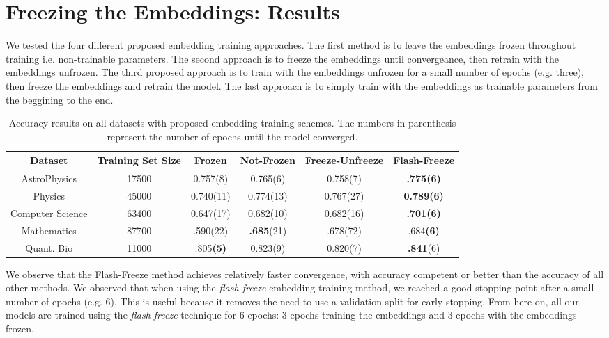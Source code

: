 \section{Freezing the Embeddings: Results}
We tested the four different proposed embedding training approaches.
The first method is to leave the embeddings frozen throughout training i.e. non-trainable parameters.
The second approach is to freeze the embeddings until convergeance, then retrain with the embeddings unfrozen.
The third proposed approach is to train with the embeddings unfrozen for a small number of epochs (e.g. three), then
freeze the embeddings and retrain the model.
The last approach is to simply train with the embeddings as trainable parameters from the beggining to the end.

\begin{center}\begin{table}[H]\begin{tabular}{||c c c c c c ||}
 \hline
 Dataset & Training Set Size & Frozen & Not-Frozen & Freeze-Unfreeze & Flash-Freeze\\ [0.5ex]
 \hline\hline
AstroPhysics & 17500 & 0.757(8) & 0.765(6) & 0.758(7) & \textbf{.775(6)}\\
Physics &  45000 & 0.740(11) & 0.774(13) & 0.767(27) & \textbf{0.789(6)}\\
Computer Science & 63400 & 0.647(17) & 0.682(10) & 0.682(16) & \textbf{.701(6)}\\
Mathematics & 87700 & .590(22) & \textbf{.685}(21) & .678(72) & .684\textbf{(6)}\\
Quant. Bio & 11000 & .805\textbf{(5)} & 0.823(9) & 0.820(7) & \textbf{.841}(6)\\
 [1ex]\hline\end{tabular}\caption{Accuracy results on all datasets with proposed embedding training schemes.
 The numbers in parenthesis represent the number of epochs until the model converged.}
\end{table}\end{center}

We observe that the Flash-Freeze method achieves relatively faster convergence, with accuracy competent or better than
the accuracy of all other methods. We observed that when using the \textit{flash-freeze} embedding training method, we reached a
good stopping point after a small number of epochs (e.g. 6). This is useful because it removes the need to use a validation split for early
stopping. From here on, all our models are trained using the \textit{flash-freeze} technique for 6 epochs: 3 epochs training the embeddings and 3 epochs
with the embeddings frozen.


